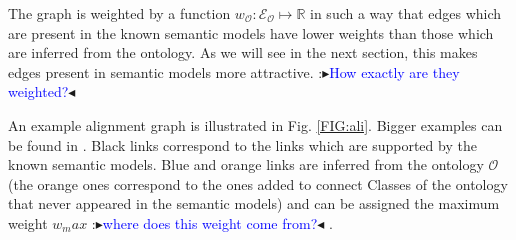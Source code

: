 \documentclass[letterpaper]{article} %
\newcommand{\authornote}[3]{
  {\fbox{\sc 
  #1}:$\blacktriangleright$\textcolor{#2}{\small{#3}}$\blacktriangleleft$}%
}
\newcommand{\ddg}[1]{\authornote{DDG}{blue}{#1}}
\begin{document}
The graph is weighted by a function $w_\mathcal{O} : \mathcal{E_O} \mapsto 
\mathbb{R}$ in 
such a way that edges which are present in
the known semantic models have lower weights than those 
which are inferred from the ontology.
As we will see in the next section, this makes edges present in semantic models more attractive. \ddg{How exactly are 
they weighted?}

An example alignment graph is illustrated in Fig. \ref{FIG:ali}. 
Bigger examples can be found in \cite{Taheriyan2013}. 
Black links correspond to the links which are supported by the known semantic models. 
Blue and orange links are inferred from the ontology $\mathcal{O}$ (the orange ones correspond to the ones added to connect Classes of the ontology that never appeared in the semantic models) and can be assigned the 
maximum weight $w_max$ \ddg{where does this weight come from?} .
\end{document}
